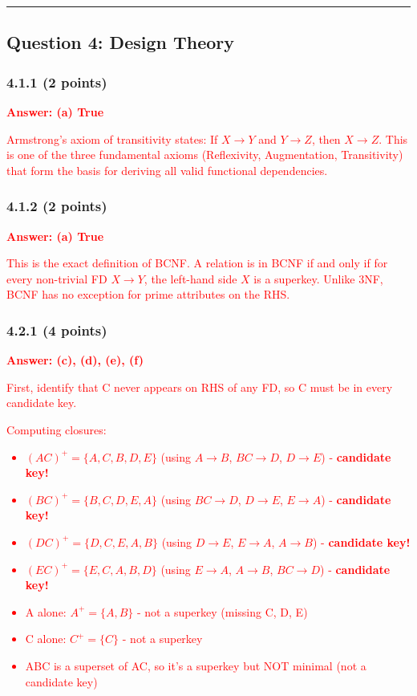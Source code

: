 \documentclass[11pt,a4paper]{article}
\begin{document}
\hrule
\vspace{1em}

\subsection*{Question 4: Design Theory}

\subsubsection*{4.1.1 (2 points)}
\textcolor{red}{\textbf{Answer: (a) True}}

\textcolor{red}{Armstrong's axiom of transitivity states: If $X \rightarrow Y$ and $Y \rightarrow Z$, then $X \rightarrow Z$. This is one of the three fundamental axioms (Reflexivity, Augmentation, Transitivity) that form the basis for deriving all valid functional dependencies.}

\subsubsection*{4.1.2 (2 points)}
\textcolor{red}{\textbf{Answer: (a) True}}

\textcolor{red}{This is the exact definition of BCNF. A relation is in BCNF if and only if for every non-trivial FD $X \rightarrow Y$, the left-hand side $X$ is a superkey. Unlike 3NF, BCNF has no exception for prime attributes on the RHS.}

\subsubsection*{4.2.1 (4 points)}
\textcolor{red}{\textbf{Answer: (c), (d), (e), (f)}}

\textcolor{red}{First, identify that C never appears on RHS of any FD, so C must be in every candidate key.}

\textcolor{red}{Computing closures:}
\textcolor{red}{\begin{itemize}
\item $(AC)^+ = \{A, C, B, D, E\}$ (using $A \rightarrow B$, $BC \rightarrow D$, $D \rightarrow E$) - \textbf{candidate key!}
\item $(BC)^+ = \{B, C, D, E, A\}$ (using $BC \rightarrow D$, $D \rightarrow E$, $E \rightarrow A$) - \textbf{candidate key!}
\item $(DC)^+ = \{D, C, E, A, B\}$ (using $D \rightarrow E$, $E \rightarrow A$, $A \rightarrow B$) - \textbf{candidate key!}
\item $(EC)^+ = \{E, C, A, B, D\}$ (using $E \rightarrow A$, $A \rightarrow B$, $BC \rightarrow D$) - \textbf{candidate key!}
\item A alone: $A^+ = \{A, B\}$ - not a superkey (missing C, D, E)
\item C alone: $C^+ = \{C\}$ - not a superkey
\item ABC is a superset of AC, so it's a superkey but NOT minimal (not a candidate key)
\end{itemize}}
\end{document}
